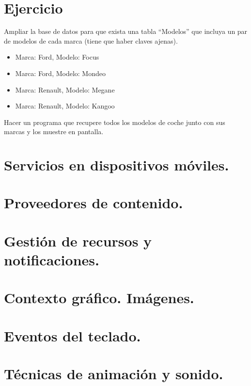 \documentclass[a4paper,12pt,spanish]{sphinxmanual}
\begin{document}
\section{Ejercicio}
\label{tema2:id6}
Ampliar la base de datos para que exista una tabla ``Modelos'' que incluya un par de modelos de cada marca (tiene que haber claves ajenas).
\begin{itemize}
\item {} 
Marca: Ford, Modelo: Focus

\item {} 
Marca: Ford, Modelo: Mondeo

\item {} 
Marca: Renault, Modelo: Megane

\item {} 
Marca: Renault, Modelo: Kangoo

\end{itemize}

Hacer un programa que recupere todos los modelos de coche junto con sus marcas y los muestre en pantalla.


\section{Servicios en dispositivos móviles.}
\label{tema2:servicios-en-dispositivos-moviles}

\section{Proveedores de contenido.}
\label{tema2:proveedores-de-contenido}

\section{Gestión de recursos y notificaciones.}
\label{tema2:gestion-de-recursos-y-notificaciones}

\section{Contexto gráfico. Imágenes.}
\label{tema2:contexto-grafico-imagenes}

\section{Eventos del teclado.}
\label{tema2:eventos-del-teclado}

\section{Técnicas de animación y sonido.}
\label{tema2:tecnicas-de-animacion-y-sonido}
\end{document}
